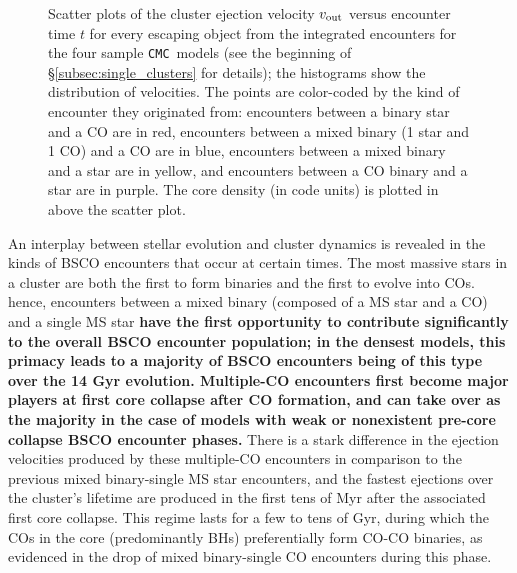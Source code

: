 \documentclass[twocolumn]{aastex631}
\newcommand{\CMC}{\texttt{CMC}}
\begin{document}
\begin{figure*}
    \caption{
        Scatter plots of the cluster ejection velocity $v_{\rm out}$ versus encounter time $t$ for every escaping object from the integrated encounters for the four sample \CMC\ models (see the beginning of \S\ref{subsec:single_clusters} for details); the histograms show the distribution of velocities.
        The points are color-coded by the kind of encounter they originated from: encounters between a binary star and a CO are in red, encounters between a mixed binary (1 star and 1 CO) and a CO are in blue, encounters between a mixed binary and a star are in yellow, and encounters between a CO binary and a star are in purple.
        The core density (in code units) is plotted in above the scatter plot.
    }
    \label{fig:cmc_single_clusters}
\end{figure*}

An interplay between stellar evolution and cluster dynamics is revealed in the kinds of BSCO encounters that occur at certain times.
The most massive stars in a cluster are both the first to form binaries and the first to evolve into COs.
hence, encounters between a mixed binary (composed of a MS star and a CO) and a single MS star \textbf{have the first opportunity to contribute significantly to the overall BSCO encounter population; in the densest models, this primacy leads to a majority of BSCO encounters being of this type over the 14 Gyr evolution.
Multiple-CO encounters first become major players at first core collapse after CO formation, and can take over as the majority in the case of models with weak or nonexistent pre-core collapse BSCO encounter phases.}
There is a stark difference in the ejection velocities produced by these multiple-CO encounters in comparison to the previous mixed binary-single MS star encounters, and the fastest ejections over the cluster's lifetime are produced in the first tens of Myr after the associated first core collapse.
This regime lasts for a few to tens of Gyr, during which the COs in the core (predominantly BHs) preferentially form CO-CO binaries, as evidenced in the drop of mixed binary-single CO encounters during this phase.
\end{document}
